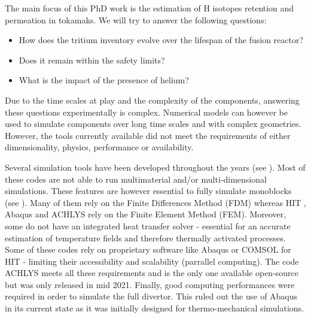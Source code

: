 The main focus of this PhD work is the estimation of H isotopes retention and permeation in tokamaks.
We will try to answer the following questions:
\begin{itemize}
    \item How does the tritium inventory evolve over the lifespan of the fusion reactor?
    \item Does it remain within the safety limits?
    \item What is the impact of the presence of helium?
\end{itemize}

Due to the time scales at play and the complexity of the components, answering these questions experimentally is complex.
Numerical models can however be used to simulate components over long time scales and with complex geometries.
However, the tools currently available did not meet the requirements of either dimensionality, physics, performance or availability.

Several simulation tools have been developed throughout the years (see ).
Most of these codes are not able to run multimaterial and/or multi-dimensional simulations.
These features are however essential to fully simulate monoblocks (see ).
Many of them rely on the Finite Differences Method (FDM) whereas HIT , Abaqus  and ACHLYS  rely on the Finite Element Method (FEM).
Moreover, some do not have an integrated heat transfer solver - essential for an accurate estimation of temperature fields and therefore thermally activated processes.
Some of these codes rely on proprietary software like Abaqus or COMSOL for HIT - limiting their accessibility and scalability (parrallel computing).
The code ACHLYS meets all these requirements and is the only one available open-source but was only released in mid 2021.
Finally, good computing performances were required in order to simulate the full divertor.
This ruled out the use of Abaqus in its current state as it was initially designed for thermo-mechanical simulations.

